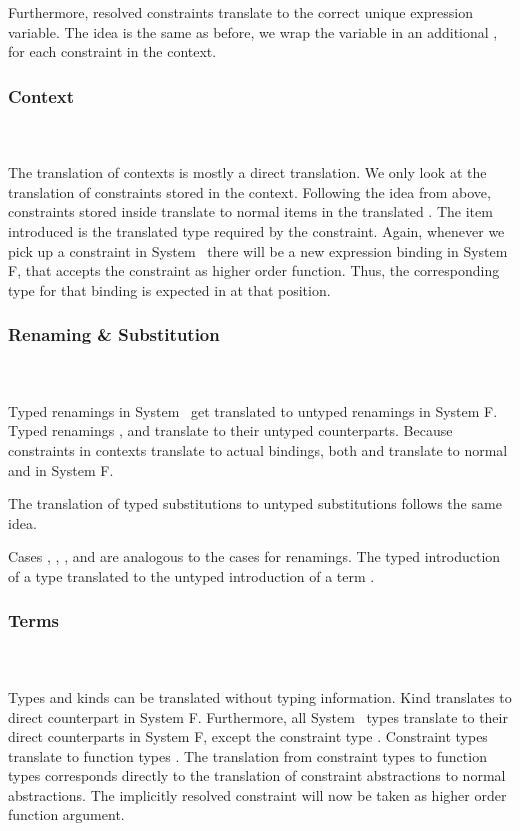 \noindent Furthermore, resolved constraints translate to the correct unique expression variable. 
\DPTOVar
The idea is the same as before, we wrap the variable in an additional , for each constraint in the context.

\subsubsection{Context}\hfill\\\\
The translation of contexts is mostly a direct translation. We only look at the translation of constraints stored in the context.
\DPTCtx
Following the idea from above, constraints  \Constr{:}  stored inside  translate to normal items in the translated . The item introduced is the translated type   required by the constraint. Again, whenever we pick up a constraint in System \Fo\, there will be a new expression binding in System F, that accepts the constraint as higher order function. Thus, the corresponding type for that binding is expected in  at that position.

\subsubsection{Renaming \& Substitution}\hfill\\\\
Typed renamings in System \Fo\ get translated to untyped renamings in System F.
\DPTRen
Typed renamings ,  and  translate to their untyped counterparts. Because constraints in contexts translate to actual bindings, both  and  translate to normal  and  in System F.

\noindent The translation of typed substitutions to untyped substitutions follows the same idea.

\DPTSub 

Cases , , ,  and  are analogous to the cases for renamings. The typed introduction of a type  translated to the untyped introduction of a term .

\subsubsection{Terms}\hfill\\\\
Types and kinds can be translated without typing information. Kind  translates to direct counterpart in System F. 
Furthermore, all System \Fo\ types translate to their direct counterparts in System F, except the constraint type \Constr{[}  \Constr{:}  \Constr{]⇒} .
\DPTType
Constraint types  \Constr{[}  \Constr{:}  \Constr{]⇒}  translate to function types   . 
The translation from constraint types to function types corresponds directly to the translation of constraint abstractions to normal abstractions. The implicitly resolved constraint will now be taken as higher order function argument.

